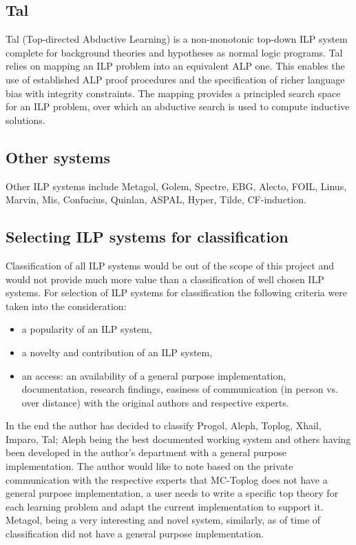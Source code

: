 \subsection{Tal\cite{corapi2010inductive}\cite{corapi2011tal}}
Tal (Top-directed Abductive Learning) is a non-monotonic top-down ILP system complete for background theories and hypotheses as normal logic programs. 
Tal relies on mapping an ILP problem into an equivalent ALP one. This enables the
use of established ALP proof procedures and the specification of richer language bias with integrity constraints. The mapping provides a principled search space for an ILP problem, over which an abductive search is used to compute inductive solutions.

\subsection{Other systems}
Other ILP systems include Metagol, Golem, Spectre, EBG, Alecto, FOIL, Linus, Marvin, Mis, Confucius, Quinlan, ASPAL, Hyper,  Tilde, CF-induction.

\subsection{Selecting ILP systems for classification}
Classification of all ILP systems would be out of the scope of this project and would not provide much more value than a classification of well chosen ILP systems.
For selection of ILP systems for classification the following criteria were taken into the consideration:

\begin{itemize}
\item a popularity of an ILP system,
\item a novelty and contribution of an ILP system,
\item an access: an availability of a general purpose implementation, documentation, research findings, easiness of communication (in person vs. over distance) with the original authors and respective experts.
\end{itemize}

In the end the author has decided to classify Progol, Aleph, Toplog, Xhail, Imparo, Tal; Aleph being the best documented working system and others having been developed in the author's department with a general purpose implementation. The author would like to note based on the private communication with the respective experts that MC-Toplog does not have a general purpose implementation, a user needs to write a specific top theory for each learning problem and adapt the current implementation to support it. Metagol\cite{muggleton2014meta}, being a very interesting and novel system, similarly, as of time of classification did not have a general purpose implementation.

